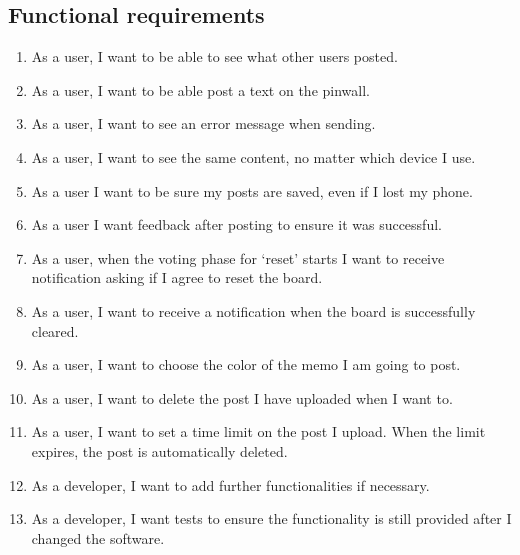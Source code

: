 \documentclass[conference]{IEEEtran}
\numberwithin{figure}{subsection}
\begin{document}
\subsection{Functional requirements}
\begin{enumerate}
 \item As a user, I want to be able to see what other users posted.\\
 \item As a user, I want to be able post a text on the pinwall.\\
 \item As a user, I want to see an error message when sending.\\
 \item As a user, I want to see the same content, no matter which device I use.\\
 \item As a user I want to be sure my posts are saved, even if I lost my phone.\\
 \item As a user I want feedback after posting to ensure it was successful.\\
 \item As a user, when the voting phase for ‘reset’ starts I want to receive notification asking if I agree to reset the board. \\
 \item As a user, I want to receive a notification when the board is successfully cleared.\\
 \item As a user, I want to choose the color of the memo I am going to post.\\
 \item As a user, I want to delete the post I have uploaded when I want to. \\
 \item As a user, I want to set a time limit on the post I upload. When the limit expires, the post is automatically deleted.\\
 \item As a developer, I want to add further functionalities if necessary.\\
 \item As a developer, I want tests to ensure the functionality is still provided after I changed the software.\\
 \end{enumerate}
 
\end{document}
